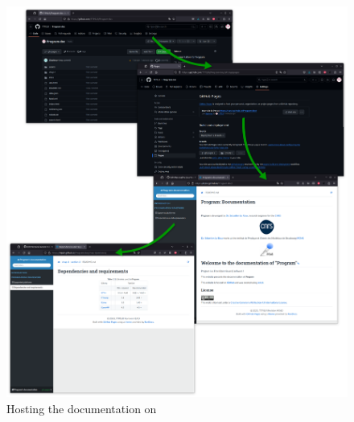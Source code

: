 \begin{figure}[!p]
\includegraphics[width=1.0\textwidth,keepaspectratio=true,draft=\ddst]{img/hosts/github/doc.eps} 
\caption{Hosting the documentation on \github\label{dgithub}}
\end{figure}

